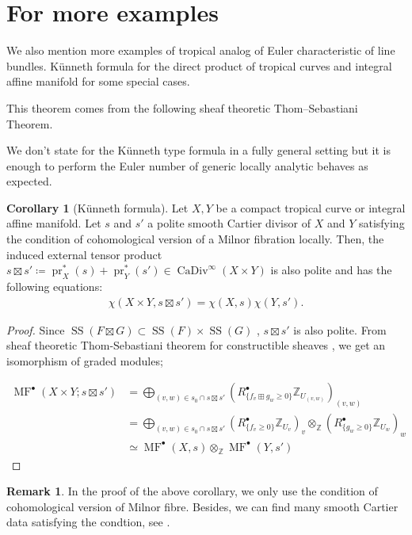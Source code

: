 \documentclass[a4paper,dvipdfmx,reqno,12pt]{amsart}
\theoremstyle{definition}
\newtheorem{Cor}[Thm]{Corollary}
\newtheorem{Rmk}[Thm]{Remark}
\newcommand{\deq}{\coloneqq}
\newcommand{\Z}{\mathbb{Z}}%
\newcommand{\opn}[1]{\operatorname{#1}}
\numberwithin{equation}{section}
\begin{document}
\section{For more examples}
We also mention more examples of 
tropical analog of Euler characteristic of 
line bundles.
 K\"unneth formula for
the direct product of tropical curves and 
integral affine manifold for some special cases.

This theorem comes from the following sheaf 
theoretic Thom--Sebastiani Theorem.



We don't state for the K\"unneth type formula in a fully
general setting but it is enough to perform the Euler number of
generic locally analytic  behaves as expected.
\begin{Cor}[{K\"unneth formula}]
Let $X,Y$ be a compact tropical curve or integral affine manifold.
Let $s$ and $s'$ a polite smooth Cartier divisor of $X$ and $Y$ 
satisfying the condition of cohomological version of a Milnor 
fibration \cite[Assumption 1.1.1]{MR2031639} locally.
Then, the induced external tensor product 
$s\boxtimes s'\deq \opn{pr}_X^{*} (s)+\opn{pr}_Y^{*}(s')
\in \opn{CaDiv}^{\infty}(X\times Y)$ is also polite and
has the following equations:
\begin{align}
\chi(X\times Y,s\boxtimes s')=\chi(X,s)\chi(Y,s').
\end{align}

\end{Cor}
\begin{proof}
Since 
$\opn{SS}(F\boxtimes G)\subset \opn{SS}(F)\times \opn{SS}(G)$
\cite[Proposition 5.4.1]{MR1299726},
$s\boxtimes s'$ is also polite.
From sheaf theoretic Thom-Sebastiani theorem for constructible sheaves 
\cite[Corollary 1.2.1]{MR2031639}, we get an isomorphism of 
graded modules;

\begin{align}
\opn{MF}^{\bullet}(X\times Y;s\boxtimes s') 
& =\bigoplus_{(v,w)\in s_0\cap s\boxtimes s'}
(R^{\bullet}_{\{f_v\boxplus g_w\geq 0\}}\Z_{U_{(v,w)}})_{(v,w)} \\
& =\bigoplus_{(v,w)\in s_0\cap s\boxtimes s'}
(R^{\bullet}_{\{f_v\geq 0\}}\Z_{U_v})_v
\otimes_{\Z} (R^{\bullet}_{\{g_w\geq 0\}}\Z_{U_w})_w \\
& \simeq
\opn{MF}^{\bullet}(X,s)\otimes_{\Z} \opn{MF}^{\bullet}(Y,s') 
\end{align}

\end{proof}

\begin{Rmk}
In the proof of the above corollary, we only use
the condition of cohomological version of Milnor fibre. 
Besides, we can find many smooth Cartier data satisfying 
the condtion, see \cite[p.35]{MR2031639}.  
\end{Rmk}
\end{document}
